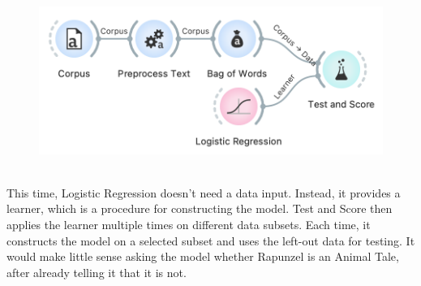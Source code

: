 \vspace{-0.2cm}
\begin{figure}[h]
  \centering
  \includegraphics[width=\linewidth]{workflow.png}%
  \caption{$\;$}
\end{figure}
\vspace{-0.3cm}

This time, Logistic Regression doesn't need a data input. Instead, it provides a learner, which is a procedure for constructing the model. Test and Score then applies the learner multiple times on different data subsets. Each time, it constructs the model on a selected subset and uses the left-out data for testing. It would make little sense asking the model whether Rapunzel is an Animal Tale, after already telling it that it is not.
\clearpage
